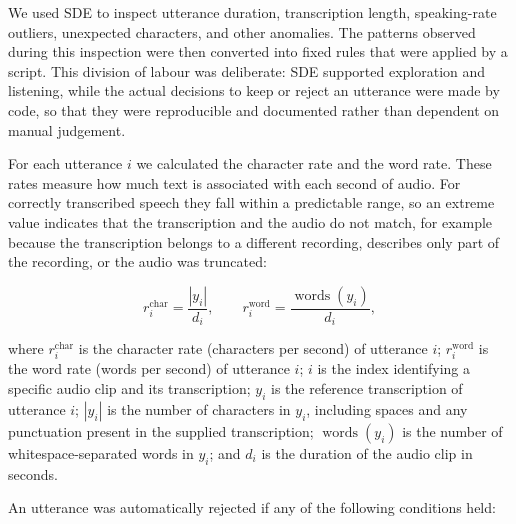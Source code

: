 We used SDE to inspect utterance duration, transcription length, speaking-rate
outliers, unexpected characters, and other anomalies. The patterns observed
during this inspection were then converted into fixed rules that were applied by
a script. This division of labour was deliberate: SDE supported exploration and
listening, while the actual decisions to keep or reject an utterance were made by
code, so that they were reproducible and documented rather than dependent on
manual judgement.

For each utterance $i$ we calculated the character rate and the word rate.
These rates measure how much text is associated with each second of audio. For
correctly transcribed speech they fall within a predictable range, so an extreme
value indicates that the transcription and the audio do not match, for example
because the transcription belongs to a different recording, describes only part
of the recording, or the audio was truncated:

\begin{equation}
    r_i^{\text{char}} = \frac{|y_i|}{d_i}, \qquad
    r_i^{\text{word}} = \frac{\operatorname{words}(y_i)}{d_i},
    \label{eq:rates}
\end{equation}

where
$r_i^{\text{char}}$ is the character rate (characters per second) of utterance $i$;
$r_i^{\text{word}}$ is the word rate (words per second) of utterance $i$;
$i$ is the index identifying a specific audio clip and its transcription;
$y_i$ is the reference transcription of utterance $i$;
$|y_i|$ is the number of characters in $y_i$, including spaces and any
punctuation present in the supplied transcription;
$\operatorname{words}(y_i)$ is the number of whitespace-separated words in $y_i$; and
$d_i$ is the duration of the audio clip in seconds.

An utterance was automatically rejected if any of the following conditions held:

